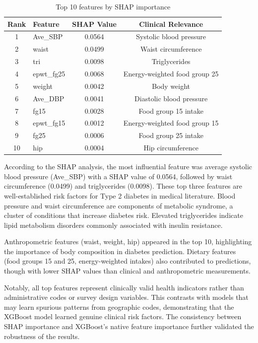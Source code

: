 \begin{table}[htbp]
\centering
\caption{Top 10 features by SHAP importance}
\label{tab:shap_importance}
\begin{tabular}{clcc}
\hline
\textbf{Rank} & \textbf{Feature} & \textbf{SHAP Value} & \textbf{Clinical Relevance} \\
\hline
1 & Ave\_SBP & 0.0564 & Systolic blood pressure \\
2 & waist & 0.0499 & Waist circumference \\
3 & tri & 0.0098 & Triglycerides \\
4 & epwt\_fg25 & 0.0068 & Energy-weighted food group 25 \\
5 & weight & 0.0042 & Body weight \\
6 & Ave\_DBP & 0.0041 & Diastolic blood pressure \\
7 & fg15 & 0.0028 & Food group 15 intake \\
8 & epwt\_fg15 & 0.0012 & Energy-weighted food group 15 \\
9 & fg25 & 0.0006 & Food group 25 intake \\
10 & hip & 0.0004 & Hip circumference \\
\hline
\end{tabular}
\end{table}

According to the SHAP analysis, the most influential feature was average systolic blood pressure (Ave\_SBP) with a SHAP value of 0.0564, followed by waist circumference (0.0499) and triglycerides (0.0098). These top three features are well-established risk factors for Type 2 diabetes in medical literature. Blood pressure and waist circumference are components of metabolic syndrome, a cluster of conditions that increase diabetes risk. Elevated triglycerides indicate lipid metabolism disorders commonly associated with insulin resistance.

Anthropometric features (waist, weight, hip) appeared in the top 10, highlighting the importance of body composition in diabetes prediction. Dietary features (food groups 15 and 25, energy-weighted intakes) also contributed to predictions, though with lower SHAP values than clinical and anthropometric measurements.

Notably, all top features represent clinically valid health indicators rather than administrative codes or survey design variables. This contrasts with models that may learn spurious patterns from geographic codes, demonstrating that the XGBoost model learned genuine clinical risk factors. The consistency between SHAP importance and XGBoost's native feature importance further validated the robustness of the results.

